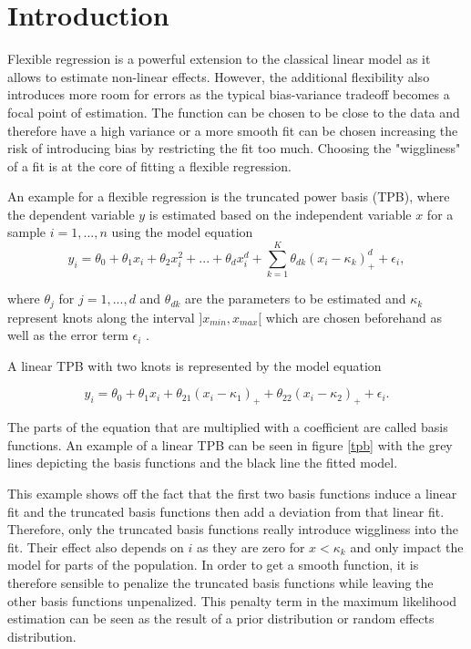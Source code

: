 \documentclass[12pt]{article}
\begin{document}
\begin{titlepage}
\clearpage
\end{titlepage}

\setcounter{page}{2}
\tableofcontents
\clearpage

\section{Introduction}\label{intro}

Flexible regression is a powerful extension to the classical linear model as it allows to estimate non-linear effects. However, the additional flexibility also introduces more room for errors as the typical bias-variance tradeoff becomes a focal point of estimation. The function can be chosen to be close to the data and therefore have a high variance or a more smooth fit can be chosen increasing the risk of introducing bias by restricting the fit too much. Choosing the "wiggliness" of a fit is at the core of fitting a flexible regression.

An example for a flexible regression is the truncated power basis (TPB), where the dependent variable $y$ is estimated based on the independent variable $x$ for a sample $i=1,...,n$ using the model equation
$$y_i = 
 \theta_0 + \theta_1x_i + \theta_2x_i^2 + ... + \theta_dx_i^d + \sum_{k=1}^K \theta_{dk}(x_i-\kappa_k)_+^d +\epsilon_i,$$
 
 where $\theta_j$ for $j= 1,...,d$ and $\theta_{dk}$ are the parameters to be estimated and $\kappa_k$ represent knots along the interval $]x_{min},x_{max}[$ which are chosen beforehand as well as the error term $\epsilon_i$ \cite{ruppert2003semiparametric, wand2003smoothing}.
 
  A linear TPB with two knots is represented by the model equation
 
 $$y_i = 
 \theta_0 + \theta_1x_i +  \theta_{21}(x_i-\kappa_1)_+ + \theta_{22}(x_i-\kappa_2)_+ + \epsilon_i.$$
 
 The parts of the equation that are multiplied with a coefficient are called basis functions. 
An example of a linear TPB can be seen in figure \ref{tpb} with the grey lines depicting the basis functions and the black line the fitted model.
 
This example shows off the fact that the first two basis functions induce a linear fit and the truncated basis functions then add a deviation from that linear fit. Therefore, only the truncated basis functions really introduce wiggliness into the fit. 
Their effect also depends on $i$ as they are zero for $x<\kappa_k$ and only impact the model for parts of the population. 
In order to get a smooth function, it is therefore sensible to penalize the truncated basis functions while leaving the other basis functions unpenalized. This penalty term in the maximum likelihood estimation can be seen as the result of a prior distribution or random effects distribution. 
\end{document}
